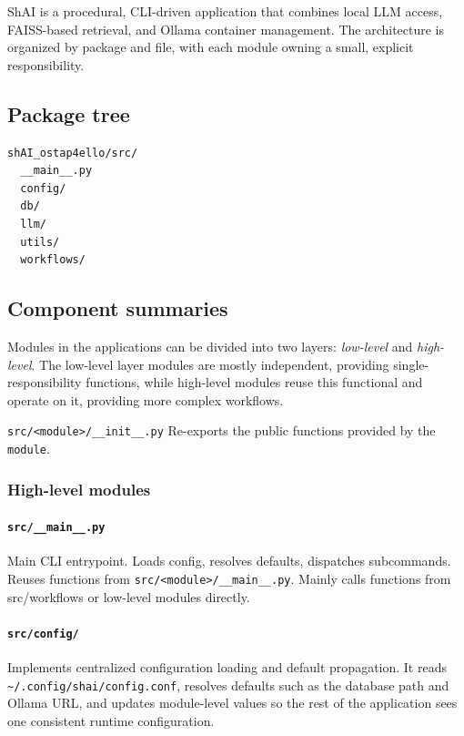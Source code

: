 ShAI is a procedural, CLI-driven application that combines local LLM access, FAISS-based retrieval,
and Ollama container management. The architecture is organized by package and file, with each module
owning a small, explicit responsibility.
\label{a-shai-architecture}

\subsection*{Package tree}

\begin{verbatim}
shAI_ostap4ello/src/
  __main__.py
  config/
  db/
  llm/
  utils/
  workflows/
\end{verbatim}


\subsection*{Component summaries}

Modules in the applications can be divided into two layers: \textsl{low-level}
and \textsl{high-level}. The low-level layer modules are mostly independent,
providing single-responsibility functions, while high-level modules reuse this
functional and operate on it, providing more complex workflows.

\texttt{src/<module>/\_\_init\_\_.py} Re-exports the public functions provided
by the \texttt{module}.


\subsubsection*{High-level modules}

\paragraph{\texttt{src/\_\_main\_\_.py}}
Main CLI entrypoint. Loads config, resolves defaults, dispatches subcommands.
Reuses functions from \texttt{src/<module>/\_\_main\_\_.py}. Mainly calls functions from
src/workflows or low-level modules directly.

\paragraph{\texttt{src/config/}}
Implements centralized configuration loading and default propagation. It reads
\texttt{\textasciitilde/.config/shai/config.conf}, resolves defaults such as the database path and
Ollama URL, and updates module-level values so the rest of the application sees one consistent
runtime configuration.

